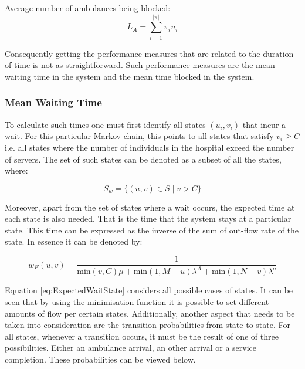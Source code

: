 Average number of ambulances being blocked:
\begin{equation}
    L_A = \sum_{i=1}^{|\pi|} \pi_i u_i
\end{equation}

Consequently getting the performance measures that are related to the duration of time is not as straightforward. Such performance measures are the mean waiting time in the system and the mean time blocked in the system. 

\subsubsection{Mean Waiting Time}
To calculate such times one must first identify all states \((u_i, v_i)\) that incur a wait. For this particular Markov chain, this points to all states that satisfy \( v_i \geq C \) i.e. all states where the number of individuals in the hospital exceed the number of servers. The set of such states can be denoted as a subset of all the states, where:

\[
S_w = \{(u, v) \in S \; | \; v > C \}    
\]

Moreover, apart from the set of states where a wait occurs, the expected time at each state is also needed. That is the time that the system stays at a particular state. This time can be expressed as the inverse of the sum of out-flow rate of the state. In essence it can be denoted by:

\begin{equation} \label{eq:ExpectedWaitState}
    w_E(u,v) = \frac{1}{\text{min}(v,C)\mu + \text{min}(1, M - u)\lambda^A + \text{min}(1, N - v)\lambda^o}    
\end{equation}

Equation \ref{eq:ExpectedWaitState} considers all possible cases of states. It can be seen that by using the minimisation function it is possible to set different amounts of flow per certain states. Additionally, another aspect that needs to be taken into consideration are the transition probabilities from state to state. For all states, whenever a transition occurs, it must be the result of one of three possibilities. Either an ambulance arrival, an other arrival or a service completion. These probabilities can be viewed below.

